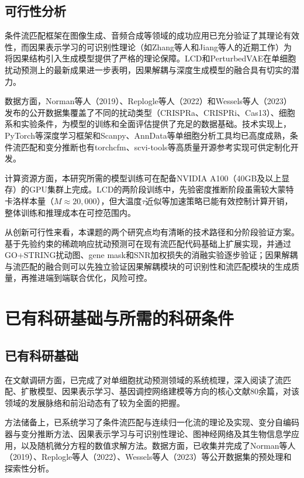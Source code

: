 \subsection{可行性分析}

条件流匹配框架在图像生成、音频合成等领域的成功应用已充分验证了其理论有效性，而因果表示学习的可识别性理论（如Zhang等人\cite{zhang2023identifiability}和Jiang等人\cite{jiang2025what}的近期工作）为将因果结构引入生成模型提供了严格的理论保障。LCD\cite{lorch2025latent}和PerturbedVAE\cite{jiang2025what}在单细胞扰动预测上的最新成果进一步表明，因果解耦与深度生成模型的融合具有切实的潜力。

数据方面，Norman等人（2019）、Replogle等人（2022）和Wessels等人（2023）发布的公开数据集覆盖了不同的扰动类型（CRISPRa、CRISPRi、Cas13）、细胞系和实验条件，为模型的训练和全面评估提供了充足的数据基础。技术实现上，PyTorch等深度学习框架和Scanpy、AnnData等单细胞分析工具均已高度成熟，条件流匹配和变分推断也有torchcfm、scvi-tools等高质量开源参考实现可供定制化开发。

计算资源方面，本研究所需的模型训练可在配备NVIDIA A100（40GB及以上显存）的GPU集群上完成。LCD的两阶段训练中，先验密度推断阶段虽需较大蒙特卡洛样本量（$M \approx 20,000$），但大温度$\tau$近似等加速策略已能有效控制计算开销，整体训练和推理成本在可控范围内。

从创新可行性来看，本课题的两个研究点均有清晰的技术路径和分阶段验证方案。基于先验约束的稀疏响应扰动预测可在现有流匹配代码基础上扩展实现，并通过GO+STRING扰动图、gene mask和SNR加权损失的消融实验逐步验证；因果解耦与流匹配的融合则可以先独立验证因果解耦模块的可识别性和流匹配模块的生成质量，再推进端到端联合优化，风险可控。

\clearpage
\section{已有科研基础与所需的科研条件}

\subsection{已有科研基础}

在文献调研方面，已完成了对单细胞扰动预测领域的系统梳理，深入阅读了流匹配、扩散模型、因果表示学习、基因调控网络建模等方向的核心文献80余篇，对该领域的发展脉络和前沿动态有了较为全面的把握。

方法储备上，已系统学习了条件流匹配与连续归一化流的理论及实现、变分自编码器与变分推断方法、因果表示学习与可识别性理论、图神经网络及其生物信息学应用，以及随机微分方程的数值求解方法。数据方面，已收集并完成了Norman等人（2019）、Replogle等人（2022）、Wessels等人（2023）等公开数据集的预处理和探索性分析。

